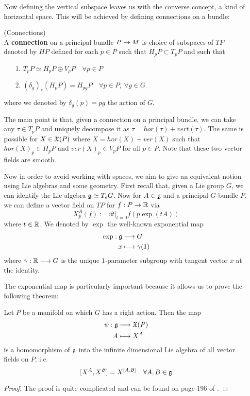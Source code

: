 Now defining the vertical subspace leaves us with the converse concept, a kind of horizontal space. This will be achieved by defining connections on a bundle:

\begin{definition}
\label{Connections}
(Connections)\\
  A \textbf{connection} on a principal bundle $P \rightarrow M$ is choice of subspaces of $TP$ denoted by $HP$ defined for each $p \in P$ such that $H_pP \subset T_pP$ and such that
  \begin{itemize}
    \item[1.] $T_pP \simeq H_pP \oplus V_pP \quad \forall p\in P$
    \item[2.] $(\delta_g)_* (H_pP) = H_{pg}P \quad \forall p \in P, \ \forall g \in G$
  \end{itemize}
  where we denoted by $\delta_g(p) = pg$ the action of $G$.
\end{definition}

The main point is that, given a connection on a principal bundle, we can take any $\tau \in T_pP$ and uniquely decompose it as $\tau = hor(\tau) + vert(\tau)$. The same is possible for $X\in \mathfrak{X}(P)$ where $X = hor(X) + ver(X)$ such that $hor(X)_p \in H_pP$ and $ver(X)_p \in V_pP$ for all $p\in P$. Note that these two vector fields are smooth. %


Now in order to avoid working with spaces, we aim to give an equivalent notion using Lie algebras and some geometry. First recall that, given a Lie group $G$, we can identify the Lie algebra $\mathfrak{g} \simeq T_eG$. Now for $A \in \mathfrak{g}$ and a principal $G$-bundle $P$, we can define a vector field on $TP$ for $f:P\rightarrow \mathbb{R}$ via
$$ X^A_p(f) := \dd{}{t}\Big|_{t=0} f(p \exp(tA)) $$
where $t\in \mathbb{R}$. We denoted by $\exp$ the well-known exponential map
\begin{align}
  \exp: \mathfrak{g} &\longrightarrow G\\
  x &\longmapsto \gamma(1)
\end{align}
where $\gamma:\mathbb{R}\longrightarrow G$ is the unique $1$-parameter subgroup with tangent vector $x$ at the identity.

The exponential map is particularly important because it allows us to prove the following theorem:

\begin{theo}
  Let $P$ be a manifold on which $G$ has a right action. Then the map
  \begin{align}
    \psi : \mathfrak{g} &\longrightarrow \mathfrak{X}(P)\\
    A &\longmapsto X^A
  \end{align}
  is a homomorphism of $\mathfrak{g}$ into the infinite dimensional Lie algebra of all vector fields on $P$, i.e.
  $$ [X^A, X^B] = X^{[A,B]} \quad \forall A,B \in \mathfrak{g} $$
\begin{proof}
  The proof is quite complicated and can be found on page $196$ of .
\end{proof}
\end{theo}

